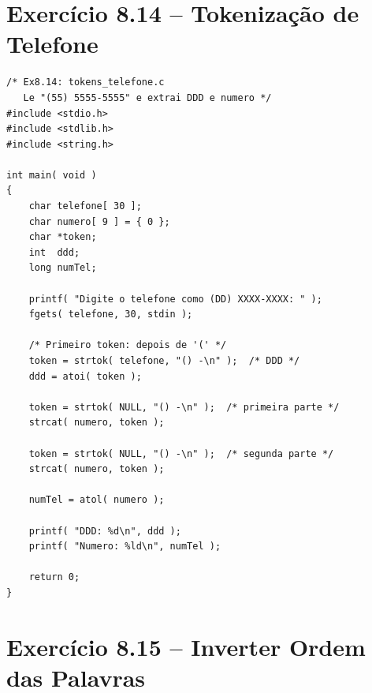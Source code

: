 \documentclass[12pt,a4paper]{article}
\begin{document}
\section{Exercício 8.14 -- Tokenização de Telefone}

\begin{respostabox}
\begin{lstlisting}
/* Ex8.14: tokens_telefone.c
   Le "(55) 5555-5555" e extrai DDD e numero */
#include <stdio.h>
#include <stdlib.h>
#include <string.h>

int main( void )
{
    char telefone[ 30 ];
    char numero[ 9 ] = { 0 };
    char *token;
    int  ddd;
    long numTel;

    printf( "Digite o telefone como (DD) XXXX-XXXX: " );
    fgets( telefone, 30, stdin );

    /* Primeiro token: depois de '(' */
    token = strtok( telefone, "() -\n" );  /* DDD */
    ddd = atoi( token );

    token = strtok( NULL, "() -\n" );  /* primeira parte */
    strcat( numero, token );

    token = strtok( NULL, "() -\n" );  /* segunda parte */
    strcat( numero, token );

    numTel = atol( numero );

    printf( "DDD: %d\n", ddd );
    printf( "Numero: %ld\n", numTel );

    return 0;
}
\end{lstlisting}
\end{respostabox}

\newpage

\section{Exercício 8.15 -- Inverter Ordem das Palavras}
\end{document}
